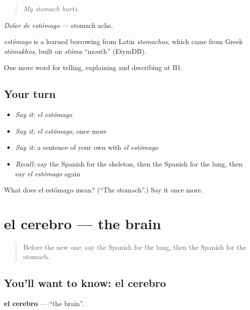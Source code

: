 \begin{quote}
\emph{My stomach hurts.}
\end{quote}

\emph{Dolor de estómago} — stomach ache.

\begin{cousinweb}
\emph{estómago} is a learned borrowing from Latin \emph{stomachus}, which came from Greek \emph{stómakhos}, built on \emph{stóma} \textquotedblleft{}mouth\textquotedblright{} (EtymDB).
\end{cousinweb}

\begin{grammarlens}[title={What you've built}]
One more word for telling, explaining and describing at B1.
\end{grammarlens}

\subsection*{Your turn}
\begin{itemize}
\raggedright
  \item \emph{Say it:} \emph{el estómago}
  \item \emph{Say it:} \emph{el estómago}, once more
  \item \emph{Say it:} a sentence of your own with \emph{el estómago}
  \item \emph{Recall:} say the Spanish for the skeleton, then the Spanish for the lung, then say \emph{el estómago} again
\end{itemize}

\begin{tcolorbox}[breakable,colback=teal!4,colframe=teal!35!black,title={Before you move on}]
What does el estómago mean? (\textquotedblleft{}The stomach\textquotedblright{}.) Say it once more.
\end{tcolorbox}
\section[el cerebro]{el cerebro — the brain}

\label{lesson:ES-C735-cerebro}



\begin{quote}
Before the new one: say the Spanish for the lung, then the Spanish for the stomach.
\end{quote}

\subsection*{You'll want to know: el cerebro}
\textbf{el cerebro} — \textquotedblleft{}the brain\textquotedblright{}.

